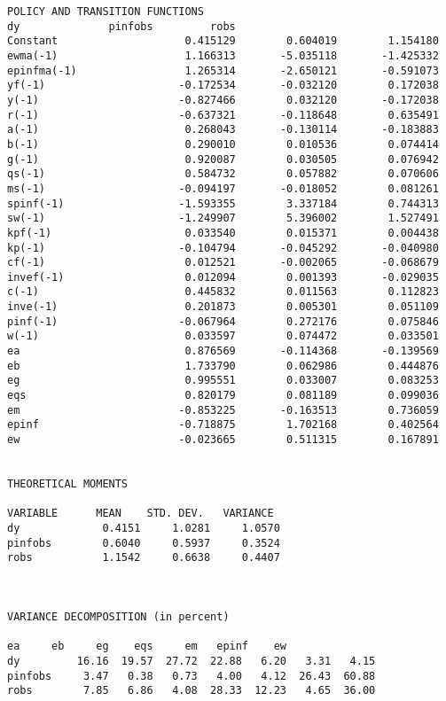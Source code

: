 \documentclass[]{article}
\begin{document}
\begin{verbatim}
POLICY AND TRANSITION FUNCTIONS
dy              pinfobs         robs   
Constant                    0.415129        0.604019        1.154180
ewma(-1)                    1.166313       -5.035118       -1.425332
epinfma(-1)                 1.265314       -2.650121       -0.591073
yf(-1)                     -0.172534       -0.032120        0.172038
y(-1)                      -0.827466        0.032120       -0.172038
r(-1)                      -0.637321       -0.118648        0.635491
a(-1)                       0.268043       -0.130114       -0.183883
b(-1)                       0.290010        0.010536        0.074414
g(-1)                       0.920087        0.030505        0.076942
qs(-1)                      0.584732        0.057882        0.070606
ms(-1)                     -0.094197       -0.018052        0.081261
spinf(-1)                  -1.593355        3.337184        0.744313
sw(-1)                     -1.249907        5.396002        1.527491
kpf(-1)                     0.033540        0.015371        0.004438
kp(-1)                     -0.104794       -0.045292       -0.040980
cf(-1)                      0.012521       -0.002065       -0.068679
invef(-1)                   0.012094        0.001393       -0.029035
c(-1)                       0.445832        0.011563        0.112823
inve(-1)                    0.201873        0.005301        0.051109
pinf(-1)                   -0.067964        0.272176        0.075846
w(-1)                       0.033597        0.074472        0.033501
ea                          0.876569       -0.114368       -0.139569
eb                          1.733790        0.062986        0.444876
eg                          0.995551        0.033007        0.083253
eqs                         0.820179        0.081189        0.099036
em                         -0.853225       -0.163513        0.736059
epinf                      -0.718875        1.702168        0.402564
ew                         -0.023665        0.511315        0.167891


THEORETICAL MOMENTS

VARIABLE      MEAN    STD. DEV.   VARIANCE 
dy             0.4151     1.0281     1.0570
pinfobs        0.6040     0.5937     0.3524
robs           1.1542     0.6638     0.4407



VARIANCE DECOMPOSITION (in percent)

ea     eb     eg    eqs     em   epinf    ew  
dy         16.16  19.57  27.72  22.88   6.20   3.31   4.15
pinfobs     3.47   0.38   0.73   4.00   4.12  26.43  60.88
robs        7.85   6.86   4.08  28.33  12.23   4.65  36.00




\end{verbatim}
\end{document}
